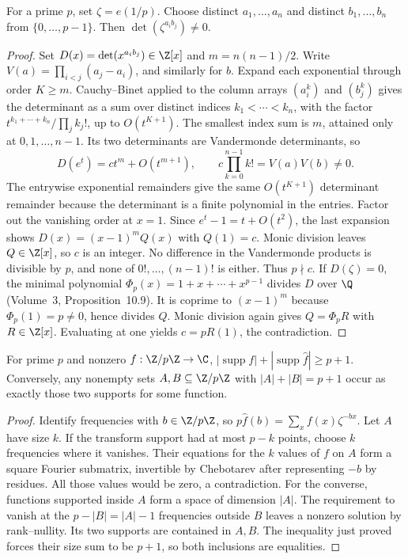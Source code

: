 \begin{lemma}[Chebotarev, 1926]\label{lem:chebotarev}
For a prime $p$, set $\zeta=e(1/p)$. Choose distinct $a_1,\ldots,a_n$ and distinct $b_1,\ldots,b_n$ from $\{0,\ldots,p-1\}$. Then $\det(\zeta^{a_ib_j})\ne0$.
\end{lemma}
\begin{proof}
Set $D(x)=\det(x^{a_ib_j})\in\Z[x]$ and $m=n(n-1)/2$. Write $V(a)=\prod_{i<j}(a_j-a_i)$, and similarly for $b$.
Expand each exponential through order $K\ge m$. Cauchy--Binet applied to the column arrays $(a_i^k)$ and $(b_j^k)$ gives the determinant as a sum over distinct indices $k_1<\cdots<k_n$, with the factor $t^{k_1+\cdots+k_n}/\prod_jk_j!$, up to $O(t^{K+1})$. The smallest index sum is $m$, attained only at $0,1,\ldots,n-1$. Its two determinants are Vandermonde determinants, so
\[
D(e^t)=ct^m+O(t^{m+1}),\qquad
c\prod_{k=0}^{n-1}k!=V(a)V(b)\ne0.
\]
The entrywise exponential remainders give the same $O(t^{K+1})$ determinant remainder because the determinant is a finite polynomial in the entries.
Factor out the vanishing order at $x=1$. Since $e^t-1=t+O(t^2)$, the last expansion shows
$D(x)=(x-1)^mQ(x)$ with $Q(1)=c$. Monic division leaves $Q\in\Z[x]$, so $c$ is an integer. No difference in the Vandermonde products is divisible by $p$, and none of $0!,\ldots,(n-1)!$ is either. Thus $p\nmid c$.
If $D(\zeta)=0$, the minimal polynomial $\Phi_p(x)=1+x+\cdots+x^{p-1}$ divides $D$ over $\Q$ (Volume~3, Proposition~10.9). It is coprime to $(x-1)^m$ because $\Phi_p(1)=p\ne0$, hence divides $Q$. Monic division again gives $Q=\Phi_pR$ with $R\in\Z[x]$. Evaluating at one yields $c=pR(1)$, the contradiction.
\end{proof}

\begin{theorem}[Tao, 2005]\label{thm:tao}
For prime $p$ and nonzero $f:\Z/p\Z\to\C$,
$|\operatorname{supp}f|+|\operatorname{supp}\hat f|\ge p+1$.
Conversely, any nonempty sets $A,B\subseteq\Z/p\Z$ with $|A|+|B|=p+1$ occur as exactly those two supports for some function.
\end{theorem}
\begin{proof}
Identify frequencies with $b\in\Z/p\Z$, so $p\hat f(b)=\sum_xf(x)\zeta^{-bx}$. Let $A$ have size $k$. If the transform support had at most $p-k$ points, choose $k$ frequencies where it vanishes. Their equations for the $k$ values of $f$ on $A$ form a square Fourier submatrix, invertible by Chebotarev after representing $-b$ by residues. All those values would be zero, a contradiction.
For the converse, functions supported inside $A$ form a space of dimension $|A|$. The requirement to vanish at the $p-|B|=|A|-1$ frequencies outside $B$ leaves a nonzero solution by rank--nullity. Its two supports are contained in $A,B$. The inequality just proved forces their size sum to be $p+1$, so both inclusions are equalities.
\end{proof}

